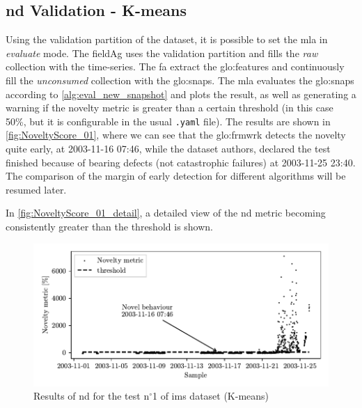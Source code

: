 \subsection{\gls{nd} Validation - K-means}
Using the validation partition of the dataset, it is possible to set the \gls{mla} in \emph{evaluate} mode. The \gls{fieldAg} uses the validation partition and fills the \emph{raw} collection with the time-series. The {\gls{fa}} extract the \gls{glo:feature}s and continuously fill the \emph{unconsumed} collection with the \gls{glo:snap}s. The \gls{mla} evaluates the \gls{glo:snap}s according to \autoref{alg:eval_new_snapshot}  and plots the result, as well as generating a warning if the novelty metric is greater than a certain threshold (in this case 50\%, but it is configurable in the usual \texttt{.yaml} file). The results are shown in \autoref{fig:NoveltyScore_01}, where we can see that the \gls{glo:frmwrk} detects the novelty quite early, at 2003-11-16 07:46, while the dataset authors, declared the test finished because of bearing defects (not catastrophic failures) at 2003-11-25 23:40. The comparison of the margin of early detection for different algorithms will be resumed later.

In \autoref{fig:NoveltyScore_01_detail}, a detailed view of the \gls{nd} metric becoming consistently greater than the threshold is shown.

\begin{figure}
    \centering
    \includegraphics{images/IMS/Novelty_01_500samples_bearing3x.pdf}
    \caption{Results of \gls{nd} for the test $\text{n}^\circ$1 of \gls{ims} dataset (K-means)}
    \label{fig:NoveltyScore_01} 
\end{figure}

